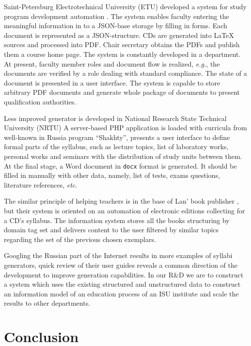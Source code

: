 \documentclass[
]{aiitart}
\begin{document}
Saint-Petersburg Electrotechnical University (ETU) developed a system for study program development automation \cite{leti}. %
The system enables faculty entering the meaningful information in to a JSON-base storage by filling in forms.  Each document is represented as a JSON-structure.  CDs are generated into \LaTeX{} sources and processed into PDF.  Chair secretary obtains the PDFs and publish them a course home page.  The system is constantly developed in a department.  At present, faculty member roles and document flow is realized, \emph{e.g.}, the documents are verified by a role dealing with standard compliance.  The state of a document is presented in a user interface.  The system is capable to store arbitrary PDF documents and generate whole package of documents to present qualification authorities.

Less improved generator is developed in National Research State Technical University (NRTU) \cite{nrtu} %
A server-based PHP application is loaded with curricula from well-known in Russia program ``Shakhty'', presents a user interface to define formal parts of the syllabus, such as lecture topics, list of laboratory works, personal works and seminars with the distribution of study units between them.  At the final stage, a Word document in \verb|docx| format is generated.  It should be filled in manually with other data, namely, list of tests, exams questions, literature references, \emph{etc}.

The similar principle of helping teachers is in the base of Lan' book publisher \cite{lanbook}, but their system is oriented on an automation of electronic editions collecting for a CD's syllabus.  The information system stores all the books structuring by domain tag set and delivers content to the user filtered by similar topics regarding the set of the previous chosen exemplars.

Googling the Russian part of the Internet results in more examples of syllabi generators, quick review of their user guides reveals a common direction of the development to improve generation capabilities.  In our R\&D we are to construct a system which uses the existing structured and unstructured data to construct an information model of an education process of an ISU institute and scale the results to other departments.

\section*{Conclusion}
\end{document}
